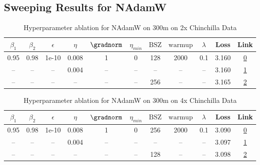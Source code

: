 \subsection{Sweeping Results for NAdamW}%
\begin{table}[H]
\centering
\caption{Hyperparameter ablation for NAdamW on 300m on 2x Chinchilla Data}
\label{tab:ablation_nadamw_300m_on_2x_chinchilla_data}
\begin{tabular}{ccccccccccc}
\toprule
$\beta_1$ & $\beta_2$ & $\epsilon$ & $\eta$ & $\gradnorm$ & $\eta_{min}$ & $\mathrm{BSZ}$ & $\mathrm{warmup}$ & $\lambda$ & Loss & Link \\
\midrule
0.95 & 0.98 & 1e-10 & 0.008 & 1 & 0 & 128 & 2000 & 0.1 & 3.160 & \href{https://wandb.ai/stanford-mercury/optimizer-scaling/runs/sweep-300m-12B-nadamwd89df2lr0.008-wd0.1-minlr0-warmup2000-b10.9-07cb43}{0} \\
\midrule
-- & -- & -- & 0.004 & -- & -- & -- & -- & -- & 3.160 & \href{https://wandb.ai/stanford-mercury/optimizer-scaling/runs/sweep-300m-12B-nadamw59ffb0lr0.004-wd0.1-minlr0-warmup2000-b10.9-f2e4bd}{1} \\
-- & -- & -- & -- & -- & -- & 256 & -- & -- & 3.165 & \href{https://wandb.ai/stanford-mercury/optimizer-scaling/runs/sweep-300m-12B-nadamwf15cf6lr0.008-wd0.1-minlr0-warmup2000-b10.9-3065ca}{2} \\
\bottomrule
\end{tabular}
\end{table}

\begin{table}[H]
\centering
\caption{Hyperparameter ablation for NAdamW on 300m on 4x Chinchilla Data}
\label{tab:ablation_nadamw_300m_on_4x_chinchilla_data}
\begin{tabular}{ccccccccccc}
\toprule
$\beta_1$ & $\beta_2$ & $\epsilon$ & $\eta$ & $\gradnorm$ & $\eta_{min}$ & $\mathrm{BSZ}$ & $\mathrm{warmup}$ & $\lambda$ & Loss & Link \\
\midrule
0.95 & 0.98 & 1e-10 & 0.008 & 1 & 0 & 256 & 2000 & 0.1 & 3.090 & \href{https://wandb.ai/stanford-mercury/optimizer-scaling/runs/sweep-300m-24B-nadamwd89df2lr0.008-wd0.1-minlr0-warmup2000-b10.9-c667e7}{0} \\
\midrule
-- & -- & -- & 0.004 & -- & -- & -- & -- & -- & 3.097 & \href{https://wandb.ai/stanford-mercury/optimizer-scaling/runs/sweep-300m-24B-nadamw59ffb0lr0.004-wd0.1-minlr0-warmup2000-b10.9-53a554}{1} \\
-- & -- & -- & -- & -- & -- & 128 & -- & -- & 3.098 & \href{https://wandb.ai/stanford-mercury/optimizer-scaling/runs/sweep-300m-24B-nadamw506173lr0.008-wd0.1-minlr0-warmup2000-b10.9-aa9d7a}{2} \\
\bottomrule
\end{tabular}
\end{table}

